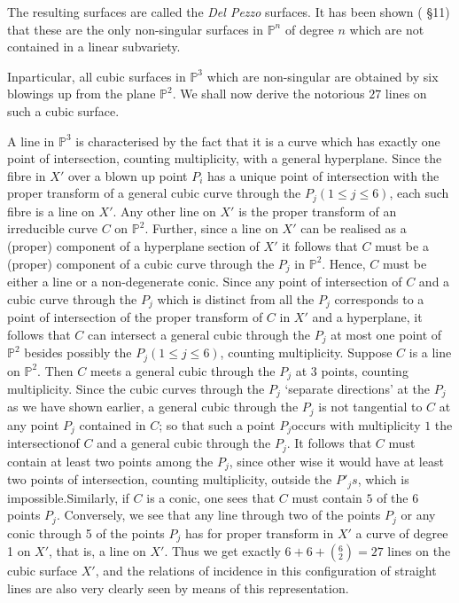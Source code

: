 The resulting surfaces are called the \textit{Del Pezzo} surfaces. It
has been shown (\cite{key18} \S 11) that these are the only non-singular
surfaces in $\mathbb{P}^n$ of degree $n$ which are not contained in a
linear subvariety. 

In\pageoriginale particular, all cubic surfaces in $\mathbb{P}^3$ which are
non-singular are obtained by six blowings up from the plane
$\mathbb{P}^2$. We shall now derive the notorious $27$ lines on such a
cubic surface. 

A line in $\mathbb{P}^3$ is characterised by the fact that it is a
curve which has exactly one point of intersection, counting
multiplicity, with a general hyperplane. Since the fibre in $X'$ over
a blown up point $P_i$ has a unique point of intersection with the
proper transform of a general cubic curve through the $P_j(1 \leq j
\leq 6)$, each such fibre is a line on $X'$. Any other line on $X'$ is
the proper transform of an irreducible curve $C$ on
$\mathbb{P}^2$. Further, since a line on $X'$ can be realised as a
(proper) component of a hyperplane section of $X'$ it follows that $C$
must be a (proper) component of a cubic curve through the $P_j$ in
$\mathbb{P}^2$. Hence, $C$ must be either a line or a non-degenerate
conic. Since any point of intersection of $C$ and a cubic curve
through the $P_j$ which is distinct from all the $P_j$ corresponds to
a point of intersection of the proper transform of $C$ in $X'$ and a
hyperplane, it follows that $C$ can intersect a general cubic through
the $P_{j}$ at most one point of $\mathbb{P}^2$  besides
possibly the $P_j(1 \leq j \leq 6)$, counting multiplicity. Suppose
$C$ is a line on $\mathbb{P}^2$. Then $C$ meets a general cubic
through the $P_j$ at 3 points, counting multiplicity. Since the cubic
curves through the $P_j$ `separate directions' at the $P_j$ as we have
shown earlier, a general cubic through the $P_j$ is not tangential to
$C$ at any point $P_j$ contained in $C$; so that such a point
$P_j$occurs with multiplicity $1$ the  intersection\pageoriginale of
$C$ and a general cubic through the $P_j$. It follows that $C$ must
contain at 
least two points among the $P_j$, since other wise it would have at least
two points of intersection, counting multiplicity, outside the $P'_j
s$, which is impossible.Similarly, if $C$ is a conic, one sees that $C$
must contain $5$ of the 6 points $P_j$. Conversely, we see that any
line through two of the points $P_j$ or any conic through 5 of the
points $P_j$ has for proper transform in $X'$ a curve of degree 1 on
$X'$, that is, a line on $X'$. Thus we get exactly $ 6 + 6 + (
^6_2)=27$ lines on the cubic surface $X'$, and the relations of
incidence in this configuration of straight lines are also very
clearly seen by means of this representation. 

